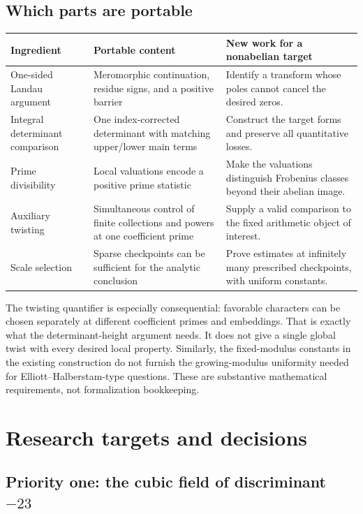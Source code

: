 \documentclass[11pt,letterpaper]{article}
\theoremstyle{definition}
\theoremstyle{remark}
\begin{document}
\subsection{Which parts are portable}

\begin{longtable}{@{}p{}p{}p{}@{}}
\toprule
Ingredient & Portable content & New work for a nonabelian target\\
\midrule
\endhead
One-sided Landau argument &
Meromorphic continuation, residue signs, and a positive barrier &
Identify a transform whose poles cannot cancel the desired zeros.\\[5pt]
Integral determinant comparison &
One index-corrected determinant with matching upper/lower main terms &
Construct the target forms and preserve all quantitative losses.\\[5pt]
Prime divisibility &
Local valuations encode a positive prime statistic &
Make the valuations distinguish Frobenius classes beyond their abelian image.\\[5pt]
Auxiliary twisting &
Simultaneous control of finite collections and powers at one coefficient prime &
Supply a valid comparison to the fixed arithmetic object of interest.\\[5pt]
Scale selection &
Sparse checkpoints can be sufficient for the analytic conclusion &
Prove estimates at infinitely many prescribed checkpoints, with uniform constants.\\
\bottomrule
\end{longtable}

The twisting quantifier is especially consequential: favorable characters
can be chosen separately at different coefficient primes and embeddings.
That is exactly what the determinant-height argument needs. It does not
give a single global twist with every desired local property. Similarly,
the fixed-modulus constants in the existing construction do not furnish
the growing-modulus uniformity needed for Elliott--Halberstam-type
questions. These are substantive mathematical requirements, not
formalization bookkeeping.





\section{Research targets and decisions}

\subsection{Priority one: the cubic field of discriminant \texorpdfstring{$-23$}{-23}}
\end{document}
